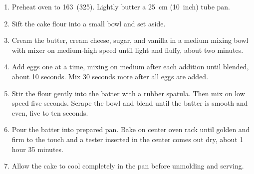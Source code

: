\prep{}

\begin{ingredients}
\end{ingredients}


\begin{recipe}
  \begin{enumerate}

  \item Preheat oven to 163\degreeC\ (325\F).  Lightly butter a 25~cm
    (10~inch) tube pan.

  \item Sift the cake flour into a small bowl and set aside.

  \item Cream the butter, cream cheese, sugar, and vanilla in a medium
    mixing bowl with mixer on medium-high speed until light and
    fluffy, about two minutes.

  \item Add eggs one at a time, mixing on medium after each addition
    until blended, about 10 seconds.  Mix 30 seconds more after all
    eggs are added.

  \item Stir the flour gently into the batter with a rubber spatula.
    Then mix on low speed five seconds.  Scrape the bowl and blend
    until the batter is smooth and even, five to ten seconds.

  \item Pour the batter into prepared pan.  Bake on center oven rack
    until golden and firm to the touch and a tester inserted in the
    center comes out dry, about 1 hour 35 minutes.

  \item Allow the cake to cool completely in the pan before unmolding
    and serving.

  \end{enumerate}
\end{recipe}
